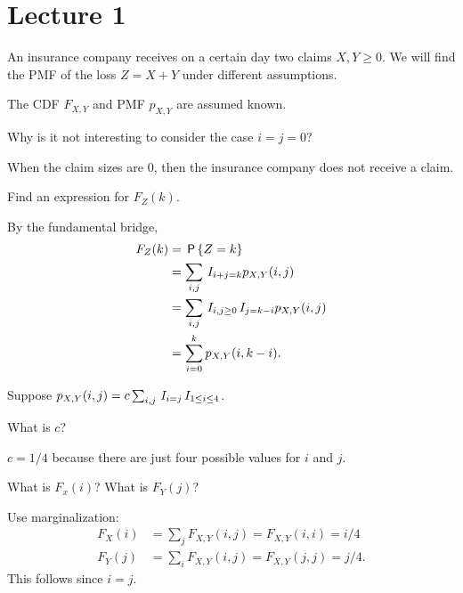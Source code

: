 \author{Nicky van Foreest and Ruben van Beesten}




\maketitle
\tableofcontents

\section{Lecture 1}

An insurance company receives on a certain day two claims $X, Y \geq 0$.
We will find the PMF of the loss $Z=X+Y$ under different assumptions.

The CDF $F_{X,Y}$ and PMF $p_{X,Y}$ are assumed known.

\begin{exercise}
Why is it not interesting to consider the case $i=j=0$?
\begin{solution}
When the claim sizes are $0$, then the insurance company does not receive a claim.
\end{solution}
\end{exercise}


\begin{exercise}
Find an expression for $F_{Z}(k)$.

\begin{solution}
By the fundamental bridge,
\begin{align}
  \label{}
F_{Z}(k) &= \,\mathsf{P}\left\{Z=k\right\} \\
&= \sum_{i,j} \,I_{i+j=k} p_{X,Y}(i,j) \\
&= \sum_{i,j} \,I_{i, j \geq 0} \,I_{j=k-i} p_{X,Y}(i,j) \\
&= \sum_{i=0}^{k} p_{X,Y}(i,k-i).
\end{align}
\end{solution}
\end{exercise}

Suppose $p_{X,Y}(i,j) = c \sum_{i,j} \,I_{i=j}\,I_{1\leq i \leq 4}$.


\begin{exercise}
What is $c$?
\begin{solution}
$c=1/4$ because there are just four possible values for $i$ and $j$.
\end{solution}
\end{exercise}

\begin{exercise}
What is $F_{x}(i)$?
What is $F_{Y}(j)$?
\begin{solution}
Use marginalization:
\begin{align*}
F_X(i) &= \sum_j F_{X,Y}(i, j) = F_{X,Y}(i,i) = i/4 \\
F_Y(j) &= \sum_i F_{X,Y}(i, j) = F_{X,Y}(j,j) = j/4.
\end{align*}
This follows since $i=j$.
\end{solution}
\end{exercise}



